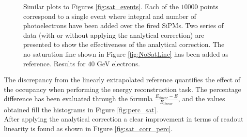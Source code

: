\begin{figure}
	\centering
	 \quad
	\caption{Similar plots to Figures \ref{fig:sat_events}. Each of the $10000$ points correspond to a single event where integral and number of photoelectrons have been added over the fired SiPMs. Two series of data (with or without applying the analytical correction) are presented to show the effectiveness of the analytical correction. The no saturation line shown in Figure \ref{fig:NoSatLine} has been added as reference. Results for $40$ GeV electrons.}
	\label{fig:sat_corr2}
\end{figure}

The discrepancy from the linearly extrapolated reference quantifies the effect of the occupancy when performing the energy reconstruction task. The percentage difference has been evaluated through the formula $\frac{E_{linear}-E}{E_{linear}}$, and the values obtained fill the histograms in Figure \ref{fig:perc_sat}.\\
After applying the analytical correction a clear improvement in terms of readout linearity is found as shown in Figure \ref{fig:sat_corr_perc}.\\


